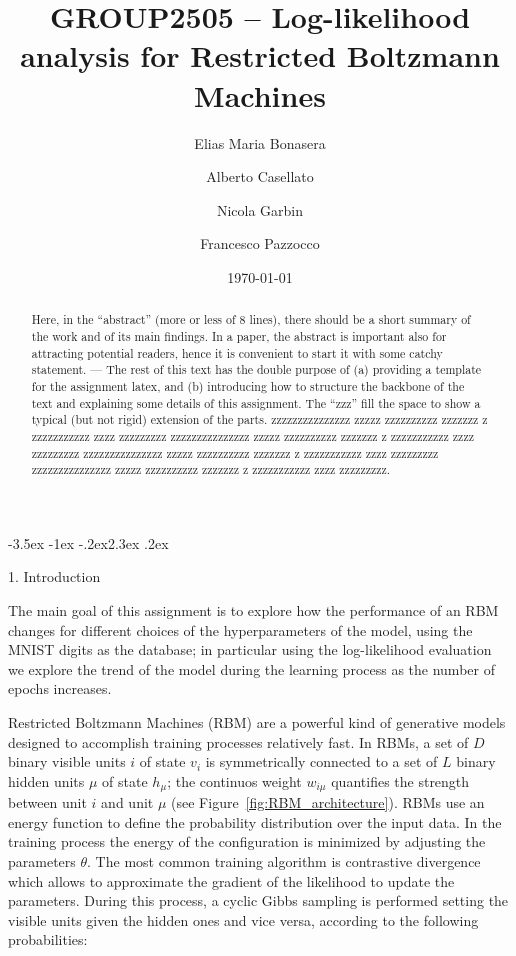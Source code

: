 \documentclass[prl,twocolumn]{revtex4-1}
\makeatletter
\renewcommand{\section}{\@startsection{section}{1}{\z@}%
	{-3.5ex \@plus -1ex \@minus -.2ex}{2.3ex \@plus.2ex}%
	{\normalfont\bfseries\raggedright}}
\numberwithin{equation}{section}
\makeatother
\begin{document}
\title{GROUP2505 -- Log-likelihood analysis for Restricted Boltzmann Machines}





\author{Elias Maria Bonasera}
\author{Alberto Casellato}
\author{Nicola Garbin}
\author{Francesco Pazzocco}

\date{\today}


\begin{abstract}
  Here, in the ``abstract'' (more or less of 8 lines), there should be a short summary of the work and of its main findings. In a paper, the abstract is important also for attracting potential readers, hence it is convenient to start it with some catchy statement. ---
 The rest of this text has the double purpose of (a) providing a template for the assignment latex, and (b) introducing how to structure the backbone of the text and explaining some details of this assignment. The ``zzz'' fill the space to show a typical (but not rigid) extension of the parts.
  zzzzzzzzzzzzzzz zzzzz zzzzzzzzzz zzzzzzz z zzzzzzzzzzz zzzz zzzzzzzzz
  zzzzzzzzzzzzzzz zzzzz zzzzzzzzzz zzzzzzz z zzzzzzzzzzz zzzz zzzzzzzzz
  zzzzzzzzzzzzzzz zzzzz zzzzzzzzzz zzzzzzz z zzzzzzzzzzz zzzz zzzzzzzzz
  zzzzzzzzzzzzzzz zzzzz zzzzzzzzzz zzzzzzz z zzzzzzzzzzz zzzz zzzzzzzzz.
\end{abstract}

\maketitle


\section{1. Introduction}

The main goal of this assignment is to explore how the performance of an RBM changes for different choices of the hyperparameters of the model, using the MNIST digits as the database; in particular using the log-likelihood evaluation we explore the trend of the model during the learning process as the number of epochs increases.

Restricted Boltzmann Machines (RBM) are a powerful kind of generative models designed to accomplish training processes relatively fast. In RBMs, a set of $D$ binary visible units $i$ of state $v_i$ is symmetrically connected to a set of $L$ binary hidden units $\mu$ of state $h_\mu$; the continuos weight $w_{i\mu}$ quantifies the strength between unit $i$ and unit $\mu$ (see Figure~\ref{fig:RBM_architecture}). RBMs use an energy function to define the probability distribution over the input data. In the training process the energy of the configuration is minimized by adjusting the parameters $\theta$. The most common training algorithm is contrastive divergence which allows to approximate the gradient of the likelihood to update the parameters. During this process, a cyclic Gibbs sampling is performed setting the visible units given the hidden ones and vice versa, according to the following probabilities:
\end{document}
